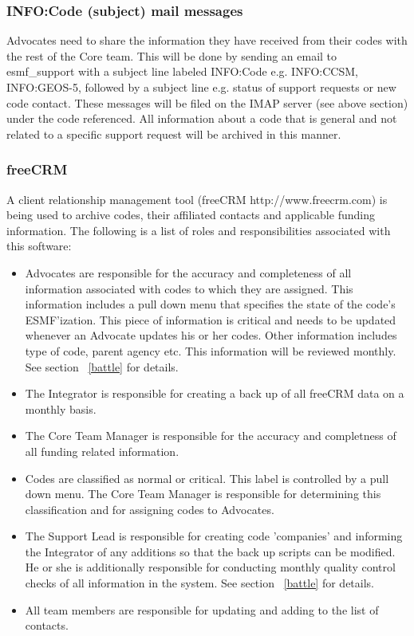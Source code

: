 \subsubsection{INFO:Code (subject) mail messages}
\label{infomail}

Advocates need to share the information they have received from their codes with the rest of the Core team. This will be done by sending an email to esmf\_support with a subject line labeled INFO:Code e.g. INFO:CCSM, INFO:GEOS-5, followed by a subject line e.g. status of support requests or new code contact.  These messages will be filed on the IMAP server (see above section) under the code referenced. All information about a code that is general and not related to a specific support request will be archived in this manner. 

\subsubsection{freeCRM}
A client relationship management tool (freeCRM http://www.freecrm.com) is being used to archive codes, their affiliated contacts and applicable funding information. The following is a list of roles and responsibilities associated with this software:
\begin{itemize}
\item Advocates are responsible for the accuracy and completeness of all information associated with codes to which they are assigned.  This information includes a pull down menu that specifies the state of the code's ESMF'ization. This piece of information is critical and needs to be updated whenever an Advocate updates his or her codes. Other information includes type of code, parent agency etc. This information will be reviewed monthly. See section ~\ref{battle} for details.
\item The Integrator is responsible for creating a back up of all freeCRM data on a monthly basis.
\item The Core Team Manager is responsible for the accuracy and completness of all funding related information.
\item Codes are classified as normal or critical. This label is controlled by a pull down menu. The Core Team Manager is responsible for determining this classification and for assigning codes to Advocates.
\item The Support Lead is responsible for creating code 'companies' and informing the Integrator of any additions so that the back up scripts can be modified. He or she is additionally responsible for conducting monthly quality control checks of all information in the system. See section ~\ref{battle} for details.
\item All team members are responsible for updating and adding to the list of contacts. 
\end{itemize} 


